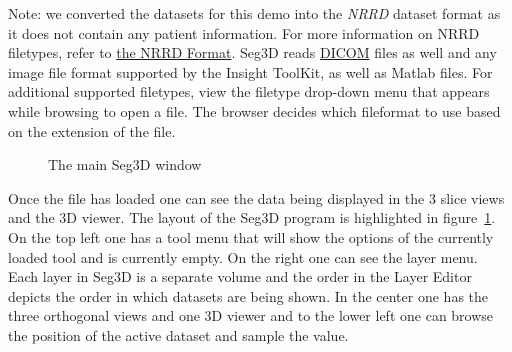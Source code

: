 \documentclass[fleqn,11pt,openany]{book}
\begin{document}
Note: we converted the datasets for this demo into the {\em NRRD} dataset format as it does not contain any patient information. For more information on NRRD filetypes, refer to \href{http://teem.sourceforge.net/nrrd/format.html}{the NRRD Format}. Seg3D reads \href{http://en.wikipedia.org/wiki/DICOM}{DICOM} files as well and any image file format supported by the Insight ToolKit, as well as Matlab files. For additional supported filetypes, view the filetype drop-down menu that appears while browsing to open a file. The browser decides which fileformat to use based on the extension of the file.

\begin{figure}
\caption{The main Seg3D window}\label{fig:MainSeg3DWindow}
\end{figure}


Once the file has loaded one can see the data being displayed in the 3 slice views and the 3D viewer. The layout of the Seg3D program is highlighted in figure~\ref{fig:MainSeg3DWindow}. On the top left one has a tool menu that will show the options of the currently loaded tool and is currently empty. On the right one can see the layer menu. Each layer in Seg3D is a separate volume and the order in the Layer Editor depicts the order in which datasets are being shown. In the center one has the three orthogonal views and one 3D viewer and to the lower left one can browse the position of the active dataset and sample the value.
\end{document}

